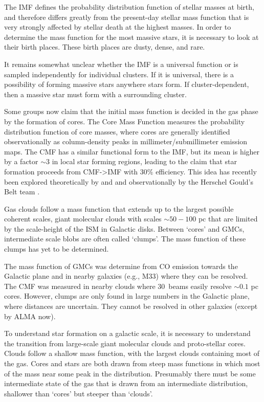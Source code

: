 The IMF defines the probability distribution function of stellar masses at
birth, and therefore differs greatly from the present-day stellar mass function
that is very strongly affected by stellar death at the highest masses.  In
order to determine the mass function for the most massive stars, it is
necessary to look at their birth places.  These birth places are dusty, dense,
and rare.  

It remains somewhat unclear whether the IMF is a universal function or is sampled
independently for individual clusters.  If it is universal, there is a possibility of
forming massive stars anywhere stars form.  If cluster-dependent, then a massive star
must form with a surrounding cluster.

Some groups now claim that the initial mass function is decided in the gas
phase by the formation of cores.  The Core Mass Function measures the
probability distribution function of core masses, where cores are generally
identified observationally as column-density peaks in millimeter/submillimeter
emission maps.  The CMF has a similar functional form to the IMF, but its mean
is higher by a factor $\sim3$ in local star forming regions, leading to the claim
that star formation proceeds from CMF->IMF with 30\% efficiency.
This idea has recently been explored theoretically by \citet{Chabrier2010a} and
\citet{Hopkins2012b} and observationally by the Herschel Gould's Belt team
\citep{Arzoumanian2011a,Andre2010a}.

Gas clouds follow a mass function that extends up to the largest
possible coherent scales, giant molecular clouds with scales $\sim50-100$ pc
that are limited by the scale-height of the ISM in Galactic disks.
Between `cores' and GMCs, intermediate scale blobs are often called `clumps'. 
The mass function of these clumps has yet to be determined.  

The mass function of GMCs was determine from CO emission towards the Galactic
plane and in nearby galaxies (e.g., M33) where they can be resolved.  The CMF
was measured in nearby clouds where 30\arcsec\ beams easily resolve $\sim0.1$
pc cores.  However, clumps are only found in large numbers in the Galactic
plane, where distances are uncertain.  They cannot be resolved in other
galaxies (except by ALMA now).

To understand star formation on a galactic scale, it is necessary to understand
the transition from large-scale giant molecular clouds and proto-stellar cores.
Clouds follow a shallow mass function, with the largest clouds containing most
of the gas.  Cores and stars are both drawn from steep mass functions in which
most of the mass near some peak in the distribution.  Presumably there must be
some intermediate state of the gas that is drawn from an intermediate
distribution, shallower than `cores' but steeper than `clouds'.  

